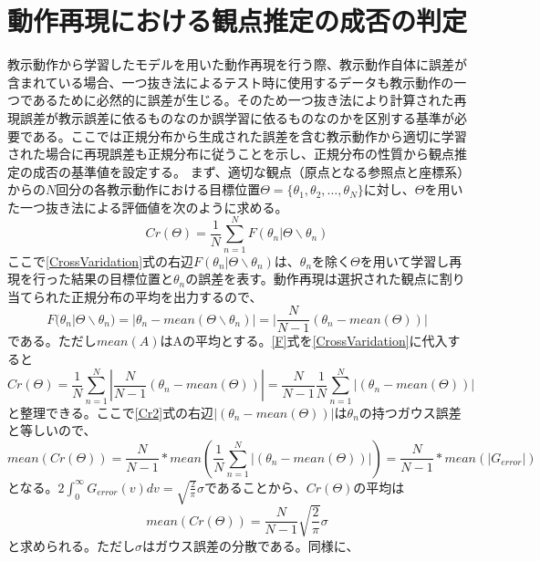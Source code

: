 \chapter{動作再現における観点推定の成否の判定}\label{appendix2}

教示動作から学習したモデルを用いた動作再現を行う際、教示動作自体に誤差が含まれている場合、一つ抜き法によるテスト時に使用するデータも教示動作の一つであるために必然的に誤差が生じる。そのため一つ抜き法により計算された再現誤差が教示誤差に依るものなのか誤学習に依るものなのかを区別する基準が必要である。ここでは正規分布から生成された誤差を含む教示動作から適切に学習された場合に再現誤差も正規分布に従うことを示し、正規分布の性質から観点推定の成否の基準値を設定する。
まず、適切な観点（原点となる参照点と座標系）からの$N$回分の各教示動作における目標位置$Θ=\{θ_{1} , θ_{2} , \ldots , θ_{N}\}$に対し、$Θ$を用いた一つ抜き法による評価値を次のように求める。
	\begin{equation}
		\label{CrossVaridation}
		Cr(Θ) = \frac{1}{N} \sum_{n=1}^{N} F(θ_{n} | Θ \backslash θ_{n})
	\end{equation}
ここで\ref{CrossVaridation}式の右辺$F(θ_{n} | Θ \backslash θ_{n})$は、$θ_{n}$を除く$Θ$を用いて学習し再現を行った結果の目標位置と$θ_{n}$の誤差を表す。動作再現は選択された観点に割り当てられた正規分布の平均を出力するので、
	\begin{equation}
		\label{F}
		F(θ_{n} | Θ \backslash θ_{n}) = |θ_{n} - mean(Θ \backslash θ_{n})| = |\frac{N}{N-1}(θ_{n} - mean(Θ))|
	\end{equation}
である。ただし$mean(A)$はAの平均とする。\ref{F}式を\ref{CrossVaridation}に代入すると
	\begin{equation}
		\label{Cr2}
		Cr(Θ) = \frac{1}{N} \sum_{n=1}^{N}  |\frac{N}{N-1}(θ_{n} - mean(Θ))|
		 = \frac{N}{N-1}\frac{1}{N}  \sum_{n=1}^{N}  |(θ_{n} - mean(Θ))| 
	\end{equation}
と整理できる。ここで\ref{Cr2}式の右辺$|(θ_{n} - mean(Θ))|$は$θ_{n}$の持つガウス誤差と等しいので、
	\begin{equation}
		\label{Cr3}
		mean(Cr(Θ)) = \frac{N}{N-1} * mean(\frac{1}{N}  \sum_{n=1}^{N}  |(θ_{n} - mean(Θ))| )
		 = \frac{N}{N-1} * mean(|G_{error}|)
	\end{equation}
となる。$2\int_{0}^{\infty}G_{error}(v)dv = \sqrt{\frac{2}{\pi}}σ$であることから、$Cr(Θ)$の平均は
	\begin{equation}
		\label{Cr4}
		mean(Cr(Θ)) = \frac{N}{N-1}\sqrt{\frac{2}{\pi}}σ
	\end{equation}
と求められる。ただし$σ$はガウス誤差の分散である。同様に、
